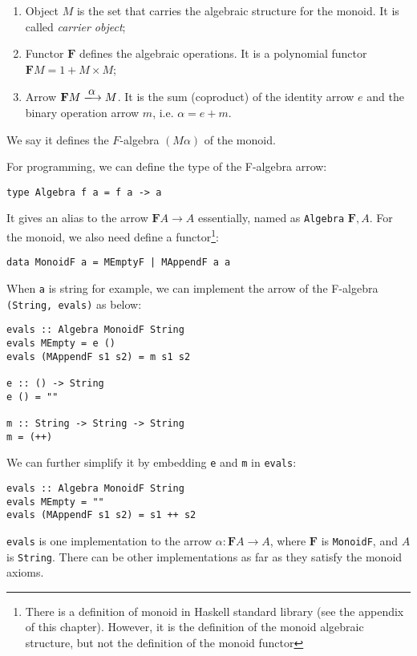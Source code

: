 \documentclass{article}
\begin{document}
\begin{example}
\begin{enumerate}
  \item Object $M$ is the set that carries the algebraic structure for the monoid. It is called {\em carrier object};
  \item Functor $\mathbf{F}$ defines the algebraic operations. It is a polynomial functor $\mathbf{F} M = 1 + M \times M$;
  \item Arrow $\mathbf{F} M \arrowto{\alpha} M$. It is the sum (coproduct) of the identity arrow $e$ and the binary operation arrow $m$, i.e. $\alpha = e + m$.
\end{enumerate}

We say it defines the $F$-algebra $(M \alpha)$ of the monoid.

For programming, we can define the type of the F-algebra arrow:

\begin{lstlisting}
type Algebra f a = f a -> a
\end{lstlisting}

It gives an alias to the arrow $\mathbf{F}A \to A$ essentially, named as \texttt{Algebra} $\mathbf{F}, A$. For the monoid, we also need define a functor\footnote{There is a definition of monoid in Haskell standard library (see the appendix of this chapter). However, it is the definition of the monoid algebraic structure, but not the definition of the monoid functor}:

\begin{lstlisting}
data MonoidF a = MEmptyF | MAppendF a a
\end{lstlisting}

When \texttt{a} is string for example, we can implement the arrow of the F-algebra \texttt{(String, evals)} as below:

\begin{lstlisting}
evals :: Algebra MonoidF String
evals MEmpty = e ()
evals (MAppendF s1 s2) = m s1 s2

e :: () -> String
e () = ""

m :: String -> String -> String
m = (++)
\end{lstlisting}

We can further simplify it by embedding \texttt{e} and \texttt{m} in \texttt{evals}:

\begin{lstlisting}
evals :: Algebra MonoidF String
evals MEmpty = ""
evals (MAppendF s1 s2) = s1 ++ s2
\end{lstlisting}

\texttt{evals} is one implementation to the arrow $\alpha : \mathbf{F}A \to A$, where $\mathbf{F}$ is \texttt{MonoidF}, and $A$ is \texttt{String}. There can be other implementations as far as they satisfy the monoid axioms.
\end{example}
\end{document}
